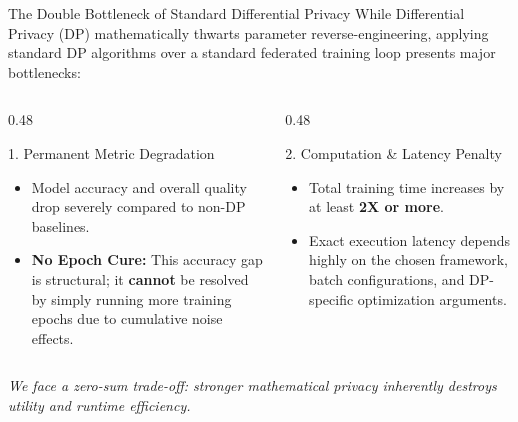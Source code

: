 \documentclass[aspectratio=169]{beamer}
\begin{document}
\begin{frame}{The Double Bottleneck of Standard Differential Privacy}
    While Differential Privacy (DP) mathematically thwarts parameter reverse-engineering, applying standard DP algorithms over a standard federated training loop presents major bottlenecks:

    \begin{columns}[T]
        \begin{column}{0.48\textwidth}
            \begin{alertblock}{1. Permanent Metric Degradation}
                \begin{itemize}
                    \item Model accuracy and overall quality drop severely compared to non-DP baselines.
                    \item \textbf{No Epoch Cure:} This accuracy gap is structural; it \textbf{cannot} be resolved by simply running more training epochs due to cumulative noise effects.
                \end{itemize}
            \end{alertblock}
        \end{column}
        
        \begin{column}{0.48\textwidth}
            \begin{alertblock}{2. Computation \& Latency Penalty}
                \begin{itemize}
                    \item Total training time increases by at least \textbf{2X or more}.
                    \item Exact execution latency depends highly on the chosen framework, batch configurations, and DP-specific optimization arguments.
                \end{itemize}
            \end{alertblock}
        \end{column}
    \end{columns}

    \vspace{0.3cm}
    \begin{center}
        \textit{We face a zero-sum trade-off: stronger mathematical privacy inherently destroys utility and runtime efficiency.}
    \end{center}
\end{frame}
\end{document}
